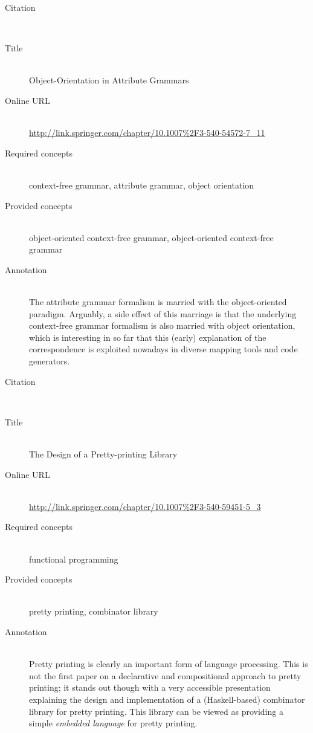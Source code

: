 \begin{description}
\item[Citation]\mbox{}\\
\cite{Koskimies91}
\item[Title]\mbox{}\\
Object-Orientation in Attribute Grammars
\item[Online URL]\mbox{}\\
{\footnotesize\url{http://link.springer.com/chapter/10.1007%2F3-540-54572-7_11}}
\item[Required concepts]\mbox{}\\
context-free grammar, attribute grammar, object orientation\item[Provided concepts]\mbox{}\\
object-oriented context-free grammar, object-oriented context-free grammar\item[Annotation]\mbox{}\\
The attribute grammar formalism is married with the object-oriented paradigm. Arguably, a side effect of this marriage is that the underlying context-free grammar formalism is also married with object orientation, which is interesting in so far that this (early) explanation of the correspondence is exploited nowadays in diverse mapping tools and code generators.
\end{description}

\begin{description}
\item[Citation]\mbox{}\\
\cite{Hughes95}
\item[Title]\mbox{}\\
The Design of a Pretty-printing Library
\item[Online URL]\mbox{}\\
{\footnotesize\url{http://link.springer.com/chapter/10.1007%2F3-540-59451-5_3}}
\item[Required concepts]\mbox{}\\
functional programming\item[Provided concepts]\mbox{}\\
pretty printing, combinator library\item[Annotation]\mbox{}\\
Pretty printing is clearly an important form of language processing. This is not the first paper on a declarative and compositional approach to pretty printing; it stands out though with a very accessible presentation explaining the design and implementation of a (Haskell-based) combinator library for pretty printing. This library can be viewed as providing a simple \emph{embedded language} for pretty printing.
\end{description}

